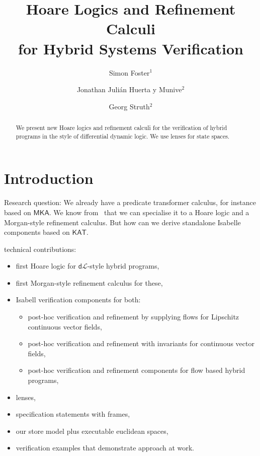 \documentclass[envcountsame]{llncs}
\newcommand{\MKA}{\mathsf{MKA}}
\newcommand{\KAT}{\mathsf{KAT}}
\newcommand{\dL}{\mathsf{d}\mathcal{L}}
\begin{document}
\title{Hoare Logics and Refinement Calculi\\ for Hybrid Systems Verification} 

\author{Simon Foster$^1$ \and Jonathan Juli\'an Huerta y Munive$^2$ \and Georg Struth$^2$} 


\maketitle

\begin{abstract} 
  We present new Hoare logics and refinement calculi for the
  verification of hybrid programs in the style of differential dynamic
  logic. We use lenses for state spaces.
\end{abstract}




\section{Introduction}\label{sec:introduction}

Research question: We already have a predicate transformer calculus,
for instance based on $\MKA$. We know from~\cite{GomesS16} that we can
specialise it to a Hoare logic and a Morgan-style refinement
calculus. But how can we derive standalone Isabelle components based
on $\KAT$. 

technical contributions:
\begin{itemize}
\item first Hoare logic for $\dL$-style hybrid programs,
\item first Morgan-style refinement calculus for these,
\item Isabell verification components for both:
  \begin{itemize}
  \item post-hoc verification and refinement by supplying flows for
    Lipschitz continuous vector fields,
\item post-hoc verification and refinement with invariants for continuous vector
  fields,
\item post-hoc verification and refinement components for flow based
  hybrid programs,
  \end{itemize}
\item lenses,
\item specification statements with frames,
\item our store model plus executable euclidean spaces,
\item verification examples that demonstrate approach at work.
\end{itemize}
\end{document}
